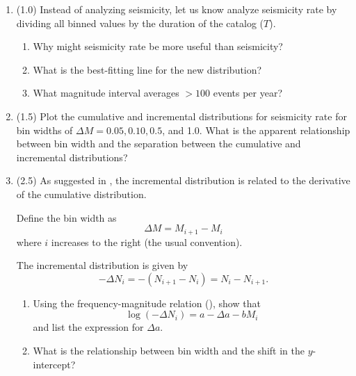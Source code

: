 \documentclass[11pt,titlepage,fleqn]{article}
\begin{document}
\begin{enumerate}

\item (1.0) Instead of analyzing seismicity, let us know analyze seismicity rate by dividing all binned values by the duration of the catalog ($T$).
%
\begin{enumerate}
\item Why might seismicity rate be more useful than seismicity?

\item What is the best-fitting line for the new distribution?

\item What magnitude interval averages $>100$ events per year?
\end{enumerate}


\item (1.5) Plot the cumulative and incremental distributions for seismicity rate for bin widths of $\Delta M = 0.05, 0.10, 0.5$, and 1.0. What is the apparent relationship between bin width and the separation between the cumulative and incremental distributions?


\item (2.5) As suggested in \citet[][p.~274]{SteinWysession}, the incremental distribution is related to the derivative of the cumulative distribution.

Define the bin width as
%
\begin{equation}
\Delta M = M_{i+1} - M_i
\label{dM}
\end{equation}
%
where $i$ increases to the right (the usual convention).

The incremental distribution is given by
%
\begin{equation}
-\Delta N_i = -(N_{i+1} - N_i) = N_i - N_{i+1}.
\end{equation}
%
\begin{enumerate}
\item Using the frequency-magnitude relation (), show that
%
\begin{equation}
\log(-\Delta N_i) = a - \Delta a - b M_i
\end{equation}
%
and list the expression for $\Delta a$.

\item What is the relationship between bin width and the shift in the $y$-intercept?


\end{enumerate}
\end{enumerate}
\end{document}
